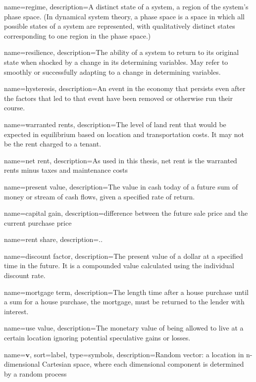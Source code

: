 {
name=regime,
description={A distinct state of a system, a region of the system's phase space. (In dynamical system theory, a phase space is a space in which all possible states of a system are represented, with qualitatively distinct  states corresponding to one region in the phase space.)}
}

{
name=resilience,
description={The ability of a system to return to its original state when shocked by a change in its determining variables. May refer to smoothly or successfully adapting to a change in  determining variables. }
}

{
name=hysteresis,
description={An event in the economy that persists even after the factors that led to that event have been removed or otherwise run their course.}
}

{
name=warranted rents,
description={The level of land rent that would be expected in equilibrium based on location and transportation costs. It may not be the rent charged to a tenant.}
}

{
name=net rent,
description={As used in this thesis, net rent is the warranted rents minus taxes and maintenance costs }
}

{
name=present value,
description={The value in cash today of a future sum of money or stream of cash flows, given a specified rate of return.}
}

{
name=capital gain,
description={difference between the future sale price and the current purchase price}
}

{
name=rent share,
description={..}
}

{
name=discount factor,
description={The present value of a dollar at a specified time in the future. It is a compounded value calculated using the individual discount rate.}
}

{
name=mortgage term,
description={The length time after a house purchase until a sum for a house purchase, the mortgage, must be returned to the lender with interest.}
}

{
name=use value,
description={The monetary value of being allowed to live at a certain location ignoring potential speculative gains or losses. }
}





{
name={$\mathbf{v}$},
sort={label},
type=symbols,
description={Random vector: a location in n-dimensional Cartesian space, where each dimensional component is determined by a random process}
}